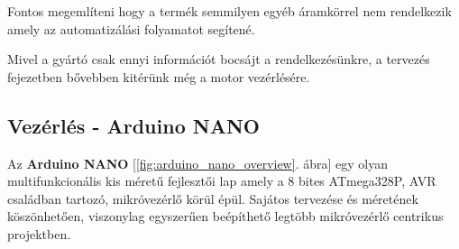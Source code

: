 \documentclass[a4paper,12pt]{article}
\begin{document}
Fontos megemlíteni hogy a termék semmilyen egyéb áramkörrel nem rendelkezik amely az automatizálási folyamatot segítené.

Mivel a gyártó csak ennyi információt bocsájt a rendelkezésünkre, a tervezés fejezetben bővebben kitérünk még a motor vezérlésére.

\subsection{Vezérlés - Arduino NANO}\label{sec:arduinonano}
Az \textbf{Arduino NANO} [\ref{fig:arduino_nano_overview}. ábra] egy olyan multifunkcionális kis méretű fejlesztői lap amely a 8 bites ATmega328P, AVR családban tartozó, mikróvezérlő körül épül.
Sajátos tervezése és méretének köszönhetően, viszonylag egyszerűen beépíthető legtöbb mikróvezérlő centrikus projektben.
\end{document}
